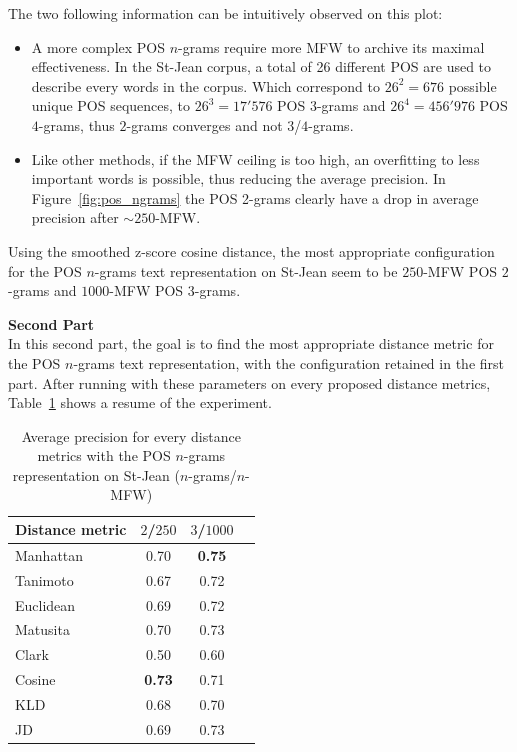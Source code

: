 The two following information can be intuitively observed on this plot:
\begin{itemize}
  \item
  A more complex POS $n$-grams require more MFW to archive its maximal effectiveness.
  In the St-Jean corpus, a total of 26 different POS are used to describe every words in the corpus.
  Which correspond to $26^2 = 676$ possible unique POS sequences, to $26^3 = 17'576$ POS $3$-grams and $26^4 = 456'976$ POS $4$-grams, thus $2$-grams converges and not $3$/$4$-grams.
  \item
  Like other methods, if the MFW ceiling is too high, an overfitting to less important words is possible, thus reducing the average precision.
  In Figure~\ref{fig:pos_ngrams} the POS 2-grams clearly have a drop in average precision after $\sim 250$-MFW.
\end{itemize}

Using the smoothed z-score cosine distance, the most appropriate configuration for the POS $n$-grams text representation on St-Jean seem to be $250$-MFW POS $2$-grams and $1000$-MFW POS $3$-grams.

\textbf{Second Part}\\
In this second part, the goal is to find the most appropriate distance metric for the POS $n$-grams text representation, with the configuration retained in the first part.
After running with these parameters on every proposed distance metrics, Table~\ref{tab:pos_ngrams} shows a resume of the experiment.

\begin{table}
  \centering
  \caption{Average precision for every distance metrics with the POS $n$-grams representation on St-Jean ($n$-grams/$n$-MFW)}
  \label{tab:pos_ngrams}
  \begin{tabular}{l c c c}
    \toprule
    Distance metric & $2$/$250$ & $3$/$1000$ \\
    \midrule
    Manhattan & 0.70 & \textbf{0.75} \\
    Tanimoto & 0.67 & 0.72 \\
    Euclidean & 0.69 & 0.72 \\
    Matusita & 0.70 & 0.73 \\
    Clark & 0.50 & 0.60 \\
    Cosine & \textbf{0.73} & 0.71 \\
    KLD & 0.68 & 0.70 \\
    JD & 0.69 & 0.73 \\
    \bottomrule
  \end{tabular}
\end{table}

